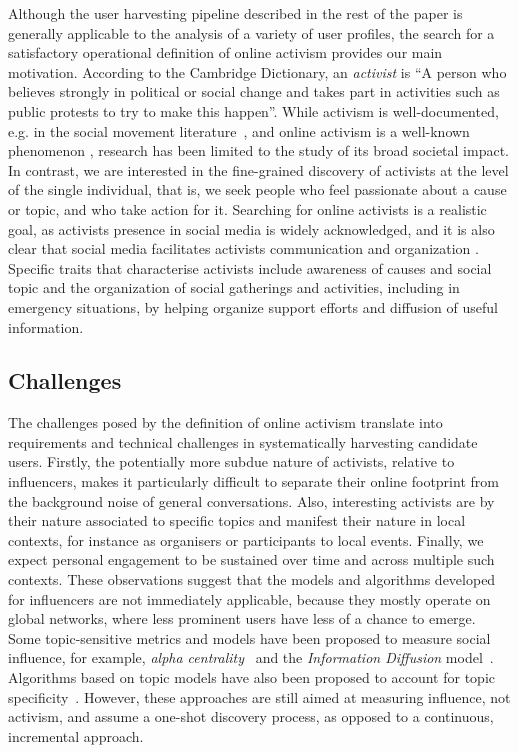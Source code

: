 Although the user harvesting pipeline described in the rest of the paper is generally applicable to the analysis of a variety of user profiles, the search for a satisfactory operational definition of online activism 
provides our main motivation. 
%
According to the Cambridge Dictionary, an \textit{activist} is ``A person who believes strongly in political or social change and takes part in activities such as public protests to try to make this happen''.
%
While activism is well-documented, e.g. in the social movement literature~\cite{doi:10.1080/14742830701497277}, and online activism is a well-known phenomenon \cite{IJoC1246}, research has been limited to the study of its broad societal impact. 
In contrast, we are interested in the fine-grained discovery of activists at the level of the single individual, that is, we seek people who feel passionate about a cause or topic, and who take action for it. 
Searching for online activists is a realistic goal, as activists presence in social media is widely acknowledged, and it is also clear that social media facilitates activists communication and organization \cite{Poell2014,Youmans2012}. 
Specific traits that characterise activists include awareness of causes and social topic and the organization of social gatherings and activities, including in emergency situations, by helping organize support efforts and diffusion of useful information.
 
\subsection{Challenges}
 
The challenges posed by the definition of online activism translate into requirements and technical challenges in systematically harvesting candidate users.
%
Firstly, the potentially more subdue nature of activists, relative to influencers, makes it particularly difficult to separate their online footprint from the background noise of general conversations.
Also, interesting activists are by their nature associated to specific topics and manifest their nature in local contexts, for instance as organisers or participants to local events. 
Finally, we expect personal engagement to be sustained over time and across multiple such contexts. 
These observations suggest that the models and algorithms developed for influencers are not immediately applicable, because they mostly operate on global networks, where less prominent users have less of a chance to emerge.
Some topic-sensitive metrics and models have been proposed to measure social influence, for example, \textit{alpha centrality}~\cite{Bonacich2001,Overbey2013} and the \textit{Information Diffusion} model~\cite{Pal2011}. Algorithms based on topic models have also been proposed to account for topic specificity~\cite{Zhao2011b}. However, these approaches are still aimed at measuring influence, not activism, and assume a one-shot discovery process, as opposed to a continuous, incremental approach.

